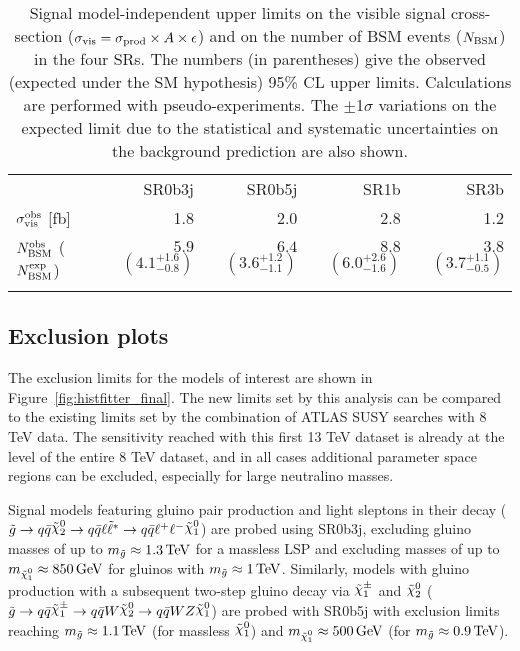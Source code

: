 \begin{table}[htb!]
\centering
\caption{Signal model-independent upper limits on 
  the visible signal cross-section ($\sigma_{\rm{vis}}=\sigma_{\rm{prod}}\times A \times\epsilon$) 
  and on the number of BSM events ($N_{\rm{BSM}}$)  
  in the four SRs. 
  The numbers (in parentheses) give the observed (expected under the SM hypothesis) 95\% CL upper
  limits. Calculations are performed with pseudo-experiments.
  The $\pm$1$\sigma$ variations on the expected limit due to the statistical and systematic uncertainties on the background prediction are also shown. 
}
\label{tab:upperlimits}
{\small
\renewcommand{\arraystretch}{1.4}
\begin{tabular*}{\textwidth}{@{\extracolsep{\fill}}lrrrr}
\noalign{\smallskip}\hline\hline\noalign{\smallskip}
         & SR0b3j         & SR0b5j     & SR1b & SR3b     \\[-0.05cm]
\noalign{\smallskip}\hline\hline\noalign{\smallskip}
$\sigma_{\rm{vis}}^{\rm{obs}}$ [fb] & 1.8 & 2.0 & 2.8 & 1.2\\
$N_{\rm{BSM}}^{\rm{obs}}$ ($N_{\rm{BSM}}^{\rm{exp}}$) 
 & $5.9$  $({4.1}^{+1.6}_{-0.8})$
 & $6.4$ $({3.6}^{+1.2}_{-1.1})$
 & $8.8$ $({6.0}^{+2.6}_{-1.6})$ 
 & $3.8$ $({3.7}^{+1.1}_{-0.5})$ \\
\noalign{\smallskip}\hline\hline\noalign{\smallskip}
  \end{tabular*}
}
\end{table} 

\FloatBarrier

\subsection{Exclusion plots}

The exclusion limits for the models of interest are shown in Figure~\ref{fig:histfitter_final}.
The new limits set by this analysis can be compared to the existing limits set by the combination of ATLAS SUSY searches with 8 TeV data. 
The sensitivity reached with this first 13 TeV dataset is already at the level of the entire 8 TeV dataset, 
and in all cases additional parameter space regions can be excluded, especially for large neutralino masses. 

Signal models featuring gluino pair production and light sleptons in their decay ($\gluino\to q\bar q\ninotwo\to q\bar q \ell\slepton^*\to q\bar q\ell^+\ell^-\ninoone$) 
are probed using SR0b3j, excluding gluino masses of up to $m_{\tilde{g}}\approx\SI{1.3}{TeV}$ for a massless LSP 
and excluding \ninoone masses of up to $m_{\ninoone}\approx\SI{850}{GeV}$ for gluinos with $m_{\tilde{g}}\approx\SI{1}{TeV}$. 
Similarly, models with gluino production  with a subsequent two-step gluino decay via $\chinoonepm$ and $\ninotwo$ 
($\gluino\to q\bar q \chinoonepm \to q\bar q W\ninotwo \to  q\bar q W Z \ninoone$) 
are probed with SR0b5j with exclusion limits reaching $m_{\tilde{g}}\approx\SI{1.1}{TeV}$ (for massless $\ninoone$) and $m_{\ninoone}\approx\SI{500}{GeV}$ (for $m_{\tilde{g}}\approx\SI{0.9}{TeV}$).


